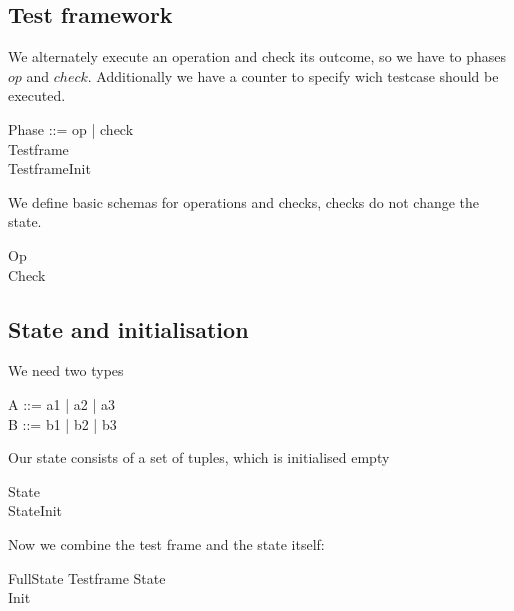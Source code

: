 \documentclass{article}
\begin{document}
\subsection*{Test framework}
We alternately execute an operation and check its outcome, so we have to
phases $op$ and $check$. Additionally we have a counter to specify wich testcase
should be executed.
\begin{zed}
  Phase ::= op | check \\
  Testframe  \\
  TestframeInit  \\
\end{zed}
We define basic schemas for operations and checks, checks do not change the state.
\begin{zed}
  Op \\
  Check \\
\end{zed}

\subsection*{State and initialisation}
We need two types
\begin{zed}
  A ::= a1 | a2 | a3 \\
  B ::= b1 | b2 | b3 \\
\end{zed}
Our state consists of a set of tuples, which is initialised empty
\begin{zed}
  State \\
  StateInit \\
\end{zed}
Now we combine the test frame and the state itself:
\begin{zed}
  FullState  Testframe \land State \\
  Init \\
\end{zed}
\end{document}
